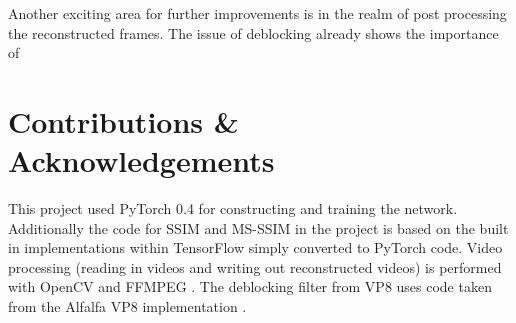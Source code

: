 \documentclass[10pt,twocolumn,letterpaper]{article}
\begin{document}
Another exciting area for further improvements is in the realm of post processing the reconstructed frames. The issue of deblocking already shows the importance of 

\section{Contributions \& Acknowledgements}
This project used PyTorch 0.4 \cite{pytorch} for constructing and training the network. Additionally the code for SSIM and MS-SSIM in the project is based on the built in implementations within TensorFlow \cite{tensorflow} simply converted to PyTorch code. Video processing (reading in videos and writing out reconstructed videos) is performed with OpenCV \cite{opencv} and FFMPEG \cite{ffmpeg}. The deblocking filter from VP8 uses code taken from the Alfalfa VP8 implementation \cite{alfalfa}.


{\small


}
\end{document}
